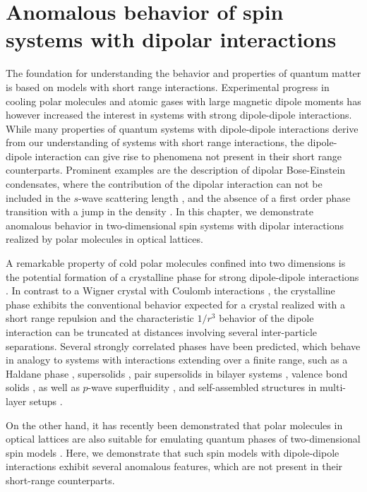 \chapter{Anomalous behavior of spin systems with dipolar interactions}
\label{anomalous_behavior}

The foundation for understanding the behavior and properties of quantum matter
is based on models with short range interactions. Experimental progress
in cooling polar molecules \cite{Ni2008b} and atomic gases with large magnetic dipole moments \cite{Griesmaier2005a}
has however increased the interest in systems with strong dipole-dipole interactions. While many
properties of quantum systems with dipole-dipole interactions derive from our understanding
of systems with short range interactions, the dipole-dipole interaction can give rise to phenomena
not present in their short range counterparts. Prominent examples are the description of dipolar
Bose-Einstein condensates, where the contribution of the dipolar interaction can not be included
in the $s$-wave scattering length \cite{Lahaye2009}, and the absence of a first order phase transition with a jump in the density \cite{Spivak2004}.
In this chapter, we demonstrate anomalous behavior in two-dimensional spin systems with dipolar interactions
realized by polar molecules in optical lattices.

A remarkable property of cold polar molecules confined into two dimensions is the potential formation
of a crystalline phase for strong dipole-dipole interactions \cite{Buchler2007,Astrakharchik2007}. In contrast to a Wigner crystal with Coulomb
interactions \cite{Bonsall1977}, the crystalline phase exhibits the conventional behavior expected for a crystal realized with a
short range repulsion and the characteristic $1/r^3$ behavior of the dipole interaction can be truncated
at distances involving several inter-particle separations. Several strongly correlated phases have been predicted, which
behave in analogy to systems with interactions extending over a finite range, such as a Haldane phase \cite{DallaTorre2006a}, supersolids \cite{Pollet2010,Capogrosso-Sansone2010}, pair supersolids in
bilayer systems \cite{Trefzger2009}, valence bond solids \cite{Bonnes2010},
as well as $p$-wave superfluidity \cite{Cooper2009}, and self-assembled structures in multi-layer setups \cite{Wang2006}.

On the other hand, it has recently been demonstrated that polar molecules in optical
lattices are also suitable for emulating quantum phases of two-dimensional spin models \cite{Micheli2006,Gorshkov2011,Gorshkov2011c}.
Here, we demonstrate that such spin models with dipole-dipole interactions exhibit several anomalous features,
which are not present in their short-range counterparts.


